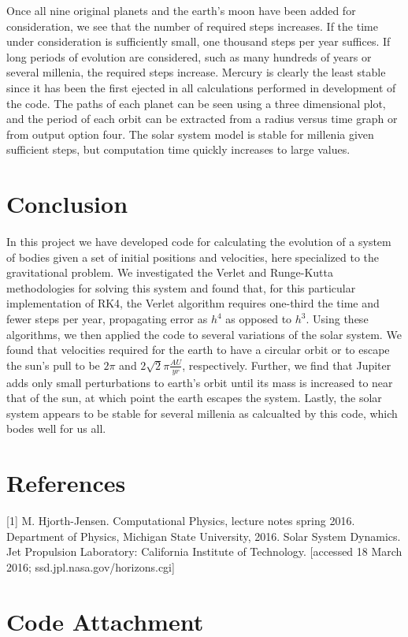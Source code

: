 \documentclass[11pt,a4paper]{article}
\begin{document}
Once all nine original planets and the earth's moon have been added for consideration, we see that the number of required steps increases. If the time under consideration is sufficiently small, one thousand steps per year suffices. If long periods of evolution are considered, such as many hundreds of years or several millenia, the required steps increase. Mercury is clearly the least stable since it has been the first ejected in all calculations performed in development of the code. The paths of each planet can be seen using a three dimensional plot, and the period of each orbit can be extracted from a radius versus time graph or from output option four. The solar system model is stable for millenia given sufficient steps, but computation time quickly increases to large values.

\section{Conclusion}

In this project we have developed code for calculating the evolution of a system of bodies given a set of initial positions and velocities, here specialized to the gravitational problem. We investigated the Verlet and Runge-Kutta methodologies for solving this system and found that, for this particular implementation of RK4, the Verlet algorithm requires one-third the time and fewer steps per year, propagating error as $h^4$ as opposed to $h^3$. Using these algorithms, we then applied the code to several variations of the solar system. We found that velocities required for the earth to have a circular orbit or to escape the sun's pull to be $2\pi$ and $2\sqrt{2}\pi \frac{AU}{yr}$, respectively. Further, we find that Jupiter adds only small perturbations to earth's orbit until its mass is increased to near that of the sun, at which point the earth escapes the system. Lastly, the solar system appears to be stable for several millenia as calcualted by this code, which bodes well for us all.

\section{References}

[1] M. Hjorth-Jensen. Computational Physics, lecture notes spring 2016. Department of Physics, Michigan State University, 2016. \newline
[2] Solar System Dynamics. Jet Propulsion Laboratory: California Institute of Technology.  [accessed 18 March 2016; ssd.jpl.nasa.gov/horizons.cgi]

\newpage

\section*{Code Attachment}
\end{document}
